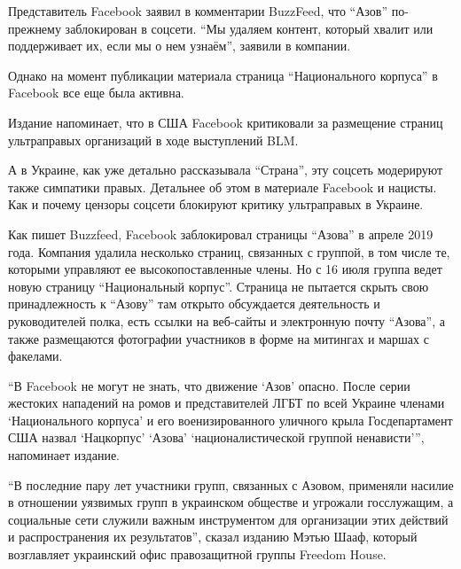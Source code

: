 Представитель Facebook заявил в комментарии BuzzFeed, что \enquote{Азов} по-прежнему
заблокирован в соцсети. \enquote{Мы удаляем контент, который хвалит или поддерживает
их, если мы о нем узнаём}, \dshM заявили в компании.

Однако на момент публикации материала страница \enquote{Национального корпуса} в
Facebook все еще была активна.

Издание напоминает, что в США Facebook критиковали за размещение страниц
ультраправых организаций в ходе выступлений BLM.

А в Украине, как уже детально рассказывала \enquote{Страна}, эту соцсеть модерируют
также симпатики правых. Детальнее об этом \dshM в материале Facebook и нацисты. Как
и почему цензоры соцсети блокируют критику ультраправых в Украине.

Как пишет Buzzfeed, Facebook заблокировал страницы \enquote{Азова} в апреле 2019 года.
Компания удалила несколько страниц, связанных с группой, в том числе те,
которыми управляют ее высокопоставленные члены. Но с 16 июля группа ведет новую
страницу \enquote{Национальный корпус}. Страница не пытается скрыть свою принадлежность
к \enquote{Азову} \dshM там открыто обсуждается деятельность и руководителей полка, есть
ссылки на веб-сайты и электронную почту \enquote{Азова}, а также размещаются фотографии
участников в форме на митингах и маршах с факелами.

\enquote{В Facebook не могут не знать, что движение \enquote{Азов} опасно. После серии жестоких
нападений на ромов и представителей ЛГБТ по всей Украине членами \enquote{Национального
корпуса} и его военизированного уличного крыла Госдепартамент США назвал
\enquote{Нацкорпус} \enquote{Азова} \enquote{националистической группой ненависти}}, \dshM напоминает
издание.

\enquote{В последние пару лет участники групп, связанных с Азовом, применяли насилие в
отношении уязвимых групп в украинском обществе и угрожали госслужащим, а
социальные сети служили важным инструментом для организации этих действий и
распространения их результатов}, \dshM сказал изданию Мэтью Шааф, который
возглавляет украинский офис правозащитной группы Freedom House.

 
